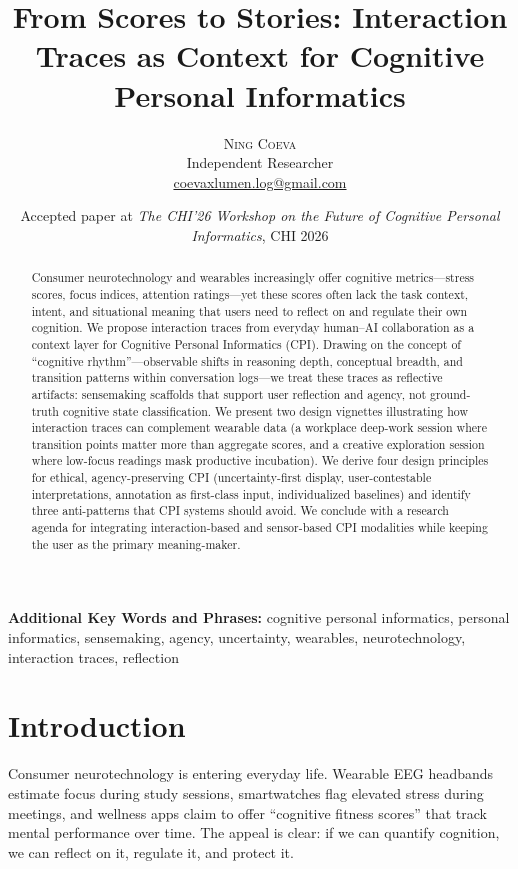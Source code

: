 \documentclass[10pt]{article}
\title{\vspace{-1.4em}\textbf{From Scores to Stories: Interaction Traces as Context for Cognitive Personal Informatics}}
\author{\textsc{Ning Coeva}\\Independent Researcher\\\href{mailto:coevaxlumen.log@gmail.com}{coevaxlumen.log@gmail.com}}
\date{\vspace{-0.8em}\small Accepted paper at \textit{The CHI'26 Workshop on the Future of Cognitive Personal Informatics}, CHI 2026}
\begin{document}
\maketitle
\vspace{-1.2em}

\begin{abstract}
Consumer neurotechnology and wearables increasingly offer cognitive metrics---stress scores, focus indices, attention ratings---yet these scores often lack the task context, intent, and situational meaning that users need to reflect on and regulate their own cognition. We propose interaction traces from everyday human--AI collaboration as a context layer for Cognitive Personal Informatics (CPI). Drawing on the concept of ``cognitive rhythm''---observable shifts in reasoning depth, conceptual breadth, and transition patterns within conversation logs---we treat these traces as reflective artifacts: sensemaking scaffolds that support user reflection and agency, not ground-truth cognitive state classification. We present two design vignettes illustrating how interaction traces can complement wearable data (a workplace deep-work session where transition points matter more than aggregate scores, and a creative exploration session where low-focus readings mask productive incubation). We derive four design principles for ethical, agency-preserving CPI (uncertainty-first display, user-contestable interpretations, annotation as first-class input, individualized baselines) and identify three anti-patterns that CPI systems should avoid. We conclude with a research agenda for integrating interaction-based and sensor-based CPI modalities while keeping the user as the primary meaning-maker.
\end{abstract}

\textbf{Additional Key Words and Phrases:} cognitive personal informatics, personal informatics, sensemaking, agency, uncertainty, wearables, neurotechnology, interaction traces, reflection

\section{Introduction}

Consumer neurotechnology is entering everyday life. Wearable EEG headbands estimate focus during study sessions, smartwatches flag elevated stress during meetings, and wellness apps claim to offer ``cognitive fitness scores'' that track mental performance over time. The appeal is clear: if we can quantify cognition, we can reflect on it, regulate it, and protect it.
\end{document}
